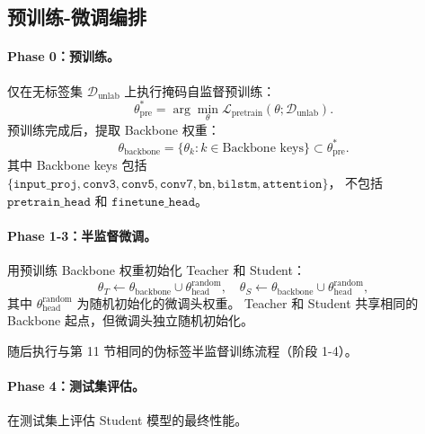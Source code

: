 \documentclass[11pt,a4paper]{article}
\begin{document}
\subsection{预训练-微调编排}

\paragraph{Phase 0：预训练。}
仅在无标签集 $\mathcal{D}_{\text{unlab}}$ 上执行掩码自监督预训练：
\[
\theta_{\text{pre}}^* = \arg\min_{\theta} \mathcal{L}_{\text{pretrain}}(\theta; \mathcal{D}_{\text{unlab}}).
\]
预训练完成后，提取 Backbone 权重：
\[
\theta_{\text{backbone}} = \{\theta_k : k \in \text{Backbone keys}\} \subset \theta_{\text{pre}}^*.
\]
其中 Backbone keys 包括 $\{\texttt{input\_proj}, \texttt{conv3}, \texttt{conv5}, \texttt{conv7}, \texttt{bn}, \texttt{bilstm}, \texttt{attention}\}$，
不包括 $\texttt{pretrain\_head}$ 和 $\texttt{finetune\_head}$。

\paragraph{Phase 1-3：半监督微调。}
用预训练 Backbone 权重初始化 Teacher 和 Student：
\[
\theta_T \leftarrow \theta_{\text{backbone}} \cup \theta_{\text{head}}^{\text{random}}, \quad
\theta_S \leftarrow \theta_{\text{backbone}} \cup \theta_{\text{head}}^{\text{random}},
\]
其中 $\theta_{\text{head}}^{\text{random}}$ 为随机初始化的微调头权重。
Teacher 和 Student 共享相同的 Backbone 起点，但微调头独立随机初始化。

随后执行与第 11 节相同的伪标签半监督训练流程（阶段 1-4）。

\paragraph{Phase 4：测试集评估。}
在测试集上评估 Student 模型的最终性能。
\end{document}
